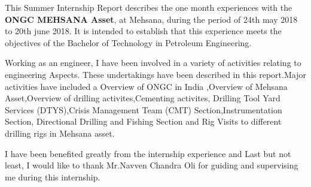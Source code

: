 \documentclass[11pt,a4paper]{report}
\makeatletter
\newcommand\mainmatter{%
    \cleardoublepage
  \pagenumbering{arabic}}
\makeatother
\begin{document}
This  Summer Internship Report  describes the one month experiences with the \textbf{ONGC MEHSANA Asset}, at Mehsana,
during the period of 24th may 2018 to 20th june 2018. It is  intended to  establish that this  experience 
meets  the  objectives  of the Bachelor of Technology in Petroleum Engineering.

\vspace{1em}

Working as  an engineer, I  have been  involved  in  a variety of activities  relating to engineering Aspects.
These  undertakings have been  described  in this  report.Major activities  have  included a Overview of ONGC 
in India ,Overview of Mehsana Asset,Overview of drilling activites,Cementing activites,
Drilling Tool Yard Services (DTYS),Crisis Management Team (CMT) Section,Instrumentation Section, 
Directional Drilling and Fishing Section and Rig Visits to different drilling rigs in Mehsana asset.

\vspace{1em}

I have been benefited greatly  from the internship experience and Last but not least,
I would like to thank Mr.Navven Chandra Oli for guiding  and supervising me during this internship. 

\newpage


\listoftables



\listoffigures



\mainmatter

\singlespacing






















\end{document}
